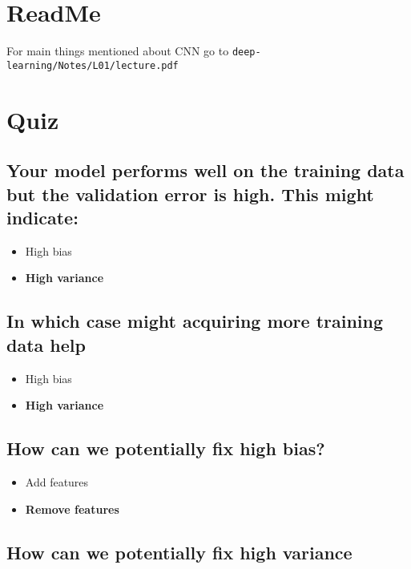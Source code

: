 \documentclass[11pt]{article}
\begin{document}


\tableofcontents

\clearpage

\section{ReadMe}

For main things mentioned about CNN go to \texttt{deep-learning/Notes/L01/lecture.pdf}

\section{Quiz}

\subsection{Your model performs well on the training data but the validation error is high. This might indicate:}

\begin{itemize}
    \item High bias
    \item \textbf{High variance}
\end{itemize}

\subsection{In which case might acquiring more training data help}

\begin{itemize}
    \item High bias
    \item \textbf{High variance}
\end{itemize}

\subsection{How can we potentially fix high bias?}

\begin{itemize}
    \item Add features
    \item \textbf{Remove features}
\end{itemize}

\subsection{How can we potentially fix high variance}
\end{document}
